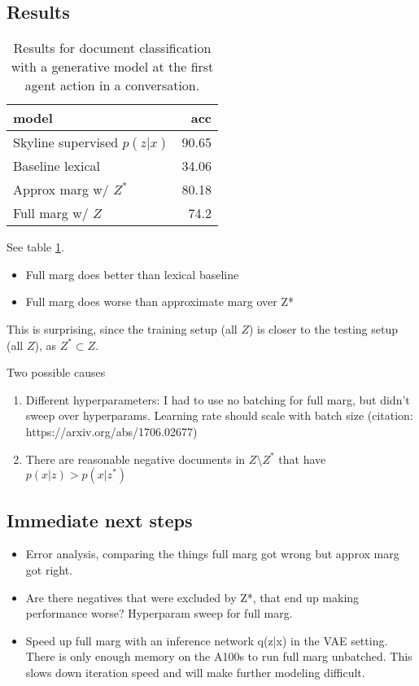 \documentclass[11pt]{article}
\begin{document}
\subsection{Results}

\begin{table}
\centering
\begin{tabular}{lr}
\toprule
model & acc\\
\midrule
Skyline supervised $p(z|x)$ & 90.65\\
Baseline lexical & 34.06\\
Approx marg w/ $Z^*$ & 80.18\\
Full marg w/ $Z$ & 74.2\\
\bottomrule
\end{tabular}
\caption{
\label{tbl:unsup-doc-app}
Results for document classification with a generative model at the first
agent action in a conversation.}
\end{table}

See table \ref{tbl:unsup-doc-app}.

\begin{itemize}
\item Full marg does better than lexical baseline
\item Full marg does worse than approximate marg over Z*
\end{itemize}
This is surprising, since the training setup (all $Z$) is closer to the testing setup (all $Z$),
as $Z^*\subset Z$.

Two possible causes
\begin{enumerate}
\item Different hyperparameters: I had to use no batching for full marg, but didn’t sweep over hyperparams. Learning rate should scale with batch size (citation: https://arxiv.org/abs/1706.02677)
\item There are reasonable negative documents in $Z \setminus Z^*$ that have $p(x|z) > p(x|z^*)$
\end{enumerate}

\subsection{Immediate next steps}
\begin{itemize}
\item Error analysis, comparing the things full marg got wrong but approx marg got right.
\item Are there negatives that were excluded by Z*, that end up making performance worse?
Hyperparam sweep for full marg.
\item Speed up full marg with an inference network q(z|x) in the VAE setting.
There is only enough memory on the A100s to run full marg unbatched. This slows down iteration speed and will make further modeling difficult.
\end{itemize}
\end{document}
